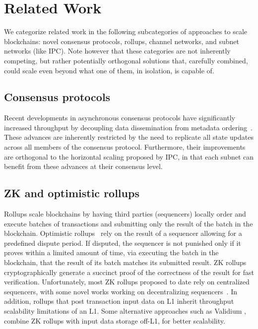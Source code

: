 \section{Related Work}
\label{sec:related-work}

    We categorize related work in the following subcategories of approaches to scale blockchains: novel consensus protocols, rollups, channel networks, and subnet networks (like IPC). Note however that   these categories are not inherently competing, but rather potentially orthogonal solutions that, carefully combined, could scale even beyond what one of them, in isolation, is capable of.  
    \subsection{Consensus protocols} Recent developments in asynchronous consensus protocols have significantly increased throughput by decoupling data dissemination from metadata ordering~\cite{keidar2021DAG, spiegelman2022Bullshark, Narwahl, Lu2020Dumbo, Lu2022Bolt, Lu2022Dumbo, aptoslabs, hedera, sui,ISS}. These advances are inherently restricted by the need to replicate all state updates across all members of the consensus protocol. Furthermore, their improvements are orthogonal to the horizontal scaling proposed by IPC, in that each subnet can benefit from these advances at their consensus level. 
    
    \subsection{ZK and optimistic rollups} Rollups scale blockchains by having third parties (sequencers) locally order and execute batches of transactions and submitting only the result of the batch in the blockchain. Optimistic rollups~\cite{kalodner2018arbitrum, rollmint} rely on the result of a sequencer allowing for a predefined dispute period. If disputed, the sequencer is not punished only if it proves within a limited amount of time, via executing the batch in the blockchain, that the result of its batch matches its submitted result. ZK rollups~\cite{nazirkhanova2021information, appliedzkp, polygon-zkevm, starkware, sin7y, matterlabs, appliedzkp, espressosys} cryptographically generate a succinct proof of the correctness of the result for fast verification. Unfortunately, most ZK rollups proposed to date rely on centralized sequencers, with some novel works working on decentralizing sequencers~\cite{espressosys}. In addition, rollups that  post transaction input data on L1 inherit throughput scalability limitations of an L1. Some alternative approaches such as Validium \cite{Validium}, combine ZK rollups with input data storage off-L1, for better scalability. 

